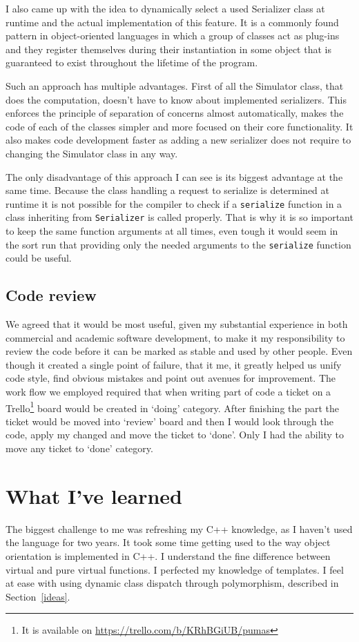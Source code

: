 \documentclass[11pt,a4paper]{article}
\begin{document}
I also came up with the idea to dynamically select a used Serializer class at runtime and the actual implementation of this feature. It is a commonly found pattern in object-oriented languages in which a group of classes act as plug-ins and they register themselves during their instantiation in some object that is guaranteed to exist throughout the lifetime of the program. 

Such an approach has multiple advantages. First of all the Simulator class, that does the computation, doesn't have to know about implemented serializers. This enforces the principle of separation of concerns almost automatically, makes the code of each of the classes simpler and more focused on their core functionality. It also makes code development faster as adding a new serializer does not require to changing the Simulator class in any way.

The only disadvantage of this approach I can see is its biggest advantage at the same time. Because the class handling a request to serialize is determined at runtime it is not possible for the compiler to check if a \texttt{serialize} function in a class inheriting from \texttt{Serializer} is called properly. That is why it is so important to keep the same function arguments at all times, even tough it would seem in the sort run that providing only the needed arguments to the \texttt{serialize} function could be useful.

\subsection{Code review}
We agreed that it would be most useful, given my substantial experience in both commercial and academic software development, to make it my responsibility to review the code before it can be marked as stable and used by other people. Even though it created a single point of failure, that it me, it greatly helped us unify code style, find obvious mistakes and point out avenues for improvement. The work flow we employed required that when writing part of code a ticket on a Trello\footnote{It is available on \url{https://trello.com/b/KRhBGiUB/pumas}} board would be created in `doing' category. After finishing the part the ticket would be moved into `review' board and then I would look through the code, apply my changed and move the ticket to `done'. Only I had the ability to move any ticket to `done' category.

\section{What I've learned}
The biggest challenge to me was refreshing my C++ knowledge, as I haven't used the language for two years. It took some time getting used to the way object orientation is implemented in C++. I understand the fine difference between virtual and pure virtual functions. I perfected my knowledge of templates. I feel at ease with using dynamic class dispatch through polymorphism, described in Section~\ref{ideas}.
\end{document}
